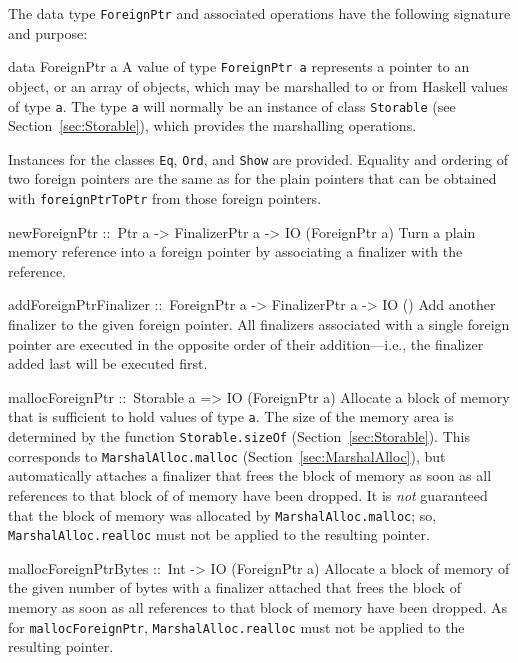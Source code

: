 \documentclass[a4paper,twoside]{article}
\makeatletter
\newcommand{\code}[1]{\texttt{#1}}      %
\newenvironment{codedesc}{%
  \list{}{\labelwidth\z@
    \let\makelabel\codedesclabel}
  }{%
  \endlist
  }
\newcommand*{\codedesclabel}[1]{%
  \hspace{-\leftmargin}
  \parbox[b]{\labelwidth}{\makebox[0pt][l]{\code{#1}}\\}\hfil\relax
  }
\makeatother
\begin{document}
The data type \code{ForeignPtr} and associated operations have the following
signature and purpose:
%
\begin{codedesc}
\item[data ForeignPtr a] A value of type \code{ForeignPtr a} represents a
  pointer to an object, or an array of objects, which may be marshalled to or
  from Haskell values of type \code{a}.  The type \code{a} will normally be an
  instance of class \code{Storable} (see Section~\ref{sec:Storable}), which
  provides the marshalling operations.
  
  Instances for the classes \code{Eq}, \code{Ord}, and \code{Show} are
  provided.  Equality and ordering of two foreign pointers are the same as for
  the plain pointers that can be obtained with \code{foreignPtrToPtr} from
  those foreign pointers.
  
\item[newForeignPtr ::\ Ptr a -> FinalizerPtr a -> IO (ForeignPtr a)]
  Turn a plain memory reference into a foreign pointer by associating a
  finalizer with the reference.  
  
\item[addForeignPtrFinalizer ::\ ForeignPtr a -> FinalizerPtr a -> IO
  ()] Add another finalizer to the given foreign pointer.  All finalizers
  associated with a single foreign pointer are executed in the opposite order
  of their addition---i.e., the finalizer added last will be executed first.

\item[mallocForeignPtr ::\ Storable a => IO (ForeignPtr a)] Allocate a block
  of memory that is sufficient to hold values of type \code{a}.  The size of
  the memory area is determined by the function \code{Storable.sizeOf}
  (Section~\ref{sec:Storable}).  This corresponds to
  \code{MarshalAlloc.malloc} (Section~\ref{sec:MarshalAlloc}), but
  automatically attaches a finalizer that frees the block of memory as soon as
  all references to that block of of memory have been dropped.  It is
  \emph{not} guaranteed that the block of memory was allocated by
  \code{MarshalAlloc.malloc}; so, \code{MarshalAlloc.realloc} must not be
  applied to the resulting pointer.

\item[mallocForeignPtrBytes ::\ Int -> IO (ForeignPtr a)] Allocate a block of
  memory of the given number of bytes with a finalizer attached that frees the
  block of memory as soon as all references to that block of memory have
  been dropped.  As for \code{mallocForeignPtr}, \code{MarshalAlloc.realloc}
  must not be applied to the resulting pointer.


\end{codedesc}
\end{document}
